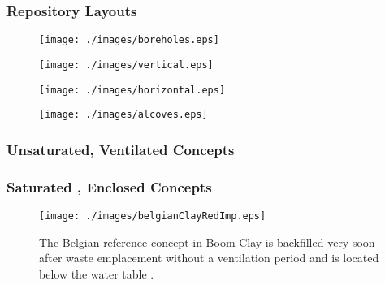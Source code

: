 \begin{frame}
  \frametitle{Repository Layouts}

  \begin{minipage}{0.49\textwidth}
    \begin{figure}[h!]
      \texttt{[image: ./images/boreholes.eps]}
    \end{figure}
    \begin{figure}[h!]
      \texttt{[image: ./images/vertical.eps]}
    \end{figure}
  \end{minipage}
  \hspace{0.01cm}
  \begin{minipage}{0.49\textwidth}
    \begin{figure}[h!]
      \texttt{[image: ./images/horizontal.eps]}
    \end{figure}
    \begin{figure}[h!]
      \texttt{[image: ./images/alcoves.eps]}
    \end{figure}
  \end{minipage}

\end{frame}

\begin{frame}
  \footnotesize{
  \frametitle{Unsaturated, Ventilated Concepts}
  
}
\end{frame}

\begin{frame}
  \footnotesize{
  \frametitle{Saturated , Enclosed Concepts} 
 \begin{figure}[h!]
    \begin{center}
      \texttt{[image: ./images/belgianClayRedImp.eps]}
    \end{center}
    \caption{The Belgian reference concept in Boom Clay is backfilled very soon
   after waste emplacement without a ventilation period and is located below the water table
   \cite{von_lensa_red-impact_2008}.}
    \label{fig:belgianClayRedImp}
  \end{figure}
}
\end{frame}

